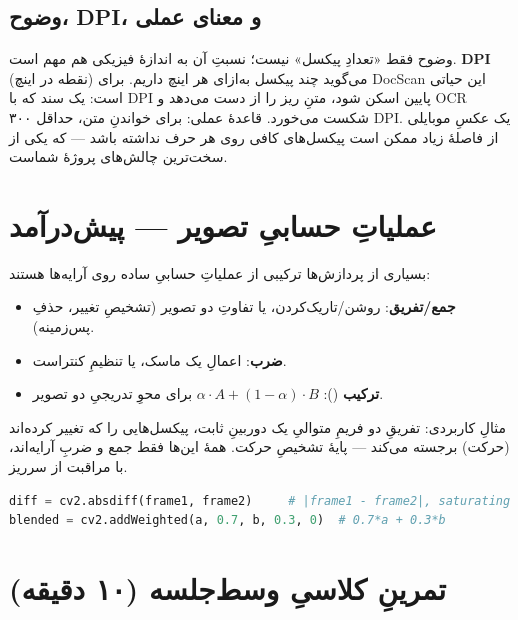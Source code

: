 \documentclass[12pt,a4paper]{article}
\begin{document}
\subsection{وضوح، DPI، و معنای عملی}

وضوح فقط «تعدادِ پیکسل» نیست؛ نسبتِ آن به اندازهٔ فیزیکی هم مهم است. \textbf{DPI} (نقطه در اینچ)
می‌گوید چند پیکسل به‌ازای هر اینچ داریم. برای DocScan این حیاتی است: یک سند که با DPIِ پایین
اسکن شود، متنِ ریز را از دست می‌دهد و OCR شکست می‌خورد. قاعدهٔ عملی: برای خواندنِ متن، حداقل
۳۰۰ DPI. یک عکسِ موبایلی از فاصلهٔ زیاد ممکن است پیکسل‌های کافی روی هر حرف نداشته باشد — که یکی
از سخت‌ترین چالش‌های پروژهٔ شماست.

\section{عملیاتِ حسابیِ تصویر — پیش‌درآمد}

بسیاری از پردازش‌ها ترکیبی از عملیاتِ حسابیِ ساده روی آرایه‌ها هستند:

\begin{itemize}
  \item \textbf{جمع/تفریق}: روشن/تاریک‌کردن، یا تفاوتِ دو تصویر (تشخیصِ تغییر، حذفِ پس‌زمینه).
  \item \textbf{ضرب}: اعمالِ یک ماسک، یا تنظیمِ کنتراست.
  \item \textbf{ترکیب} (): $\alpha \cdot A + (1-\alpha) \cdot B$ برای محوِ تدریجیِ دو تصویر.
\end{itemize}

مثالِ کاربردی: تفریقِ دو فریمِ متوالیِ یک دوربینِ ثابت، پیکسل‌هایی را که تغییر کرده‌اند (حرکت)
برجسته می‌کند — پایهٔ تشخیصِ حرکت. همهٔ این‌ها فقط جمع و ضربِ آرایه‌اند، با مراقبت از سرریز.

\begin{ltrcode}
\begin{lstlisting}[language=Python]
diff = cv2.absdiff(frame1, frame2)     # |frame1 - frame2|, saturating
blended = cv2.addWeighted(a, 0.7, b, 0.3, 0)  # 0.7*a + 0.3*b
\end{lstlisting}
\end{ltrcode}

\section{تمرینِ کلاسیِ وسط‌جلسه (۱۰ دقیقه)}
\end{document}
